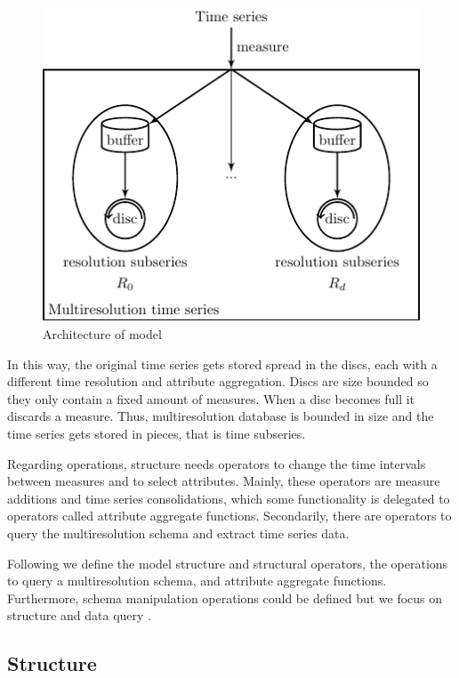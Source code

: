 \begin{figure}
  \centering
  \includegraphics{fig_model_mtsdb.pdf}
  \caption{Architecture of  model}
  \label{fig:model:mtsdb}
\end{figure}


In this way, the original time series gets stored spread in the discs,
each with a different time resolution and attribute aggregation.
Discs are size bounded so they only contain a fixed amount of
measures. When a disc becomes full it discards a measure. Thus,
multiresolution database is bounded in size and the time series gets
stored in pieces, that is time subseries.

Regarding operations,  structure needs operators to change
the time intervals between measures and to select attributes. Mainly,
these operators are measure additions and time series consolidations,
which some functionality is delegated to operators called attribute
aggregate functions. Secondarily, there are operators to query the
multiresolution schema and extract time series data.


Following we define the  model structure and structural
operators, the operations to query a multiresolution schema, and
attribute aggregate functions.  Furthermore, schema manipulation
operations could be defined but we focus on structure and data query .


\subsection{Structure}

